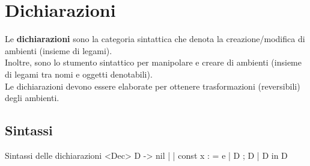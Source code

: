 
\chapter{Dichiarazioni}
Le \textcolor{colore}{\textbf{dichiarazioni}} sono la categoria sintattica che denota la creazione/modifica di ambienti (insieme di legami).\\[0.2ex]
Inoltre, sono lo stumento sintattico per manipolare e creare di ambienti (insieme di legami tra nomi e oggetti denotabili).\\[0.2ex]
Le dichiarazioni devono essere elaborate per ottenere trasformazioni (reversibili) degli ambienti.

\section{Sintassi}
\begin{bnfcode}{Sintassi delle dichiarazioni}
    <Dec>
    D -> nil | \rho | const x : \tau = e | D ; D | D in D
\end{bnfcode}

